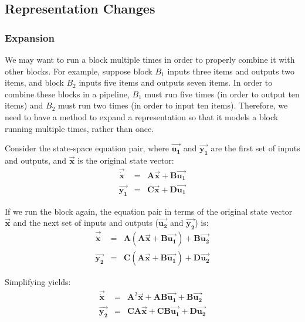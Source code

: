 \subsection{Representation Changes}

\subsubsection{Expansion}

    We may want to run a block multiple times in order to
properly combine it with other blocks. For example, suppose block
$B_1$ inputs three items and outputs two items, and block $B_2$
inputs five items and outputs seven items. In order to combine
these blocks in a pipeline, $B_1$ must run five times (in order to
output ten items) and $B_2$ must run two times (in order to input
ten items). Therefore, we need to have a method to expand a
representation so that it models a block running multiple times,
rather than once.

    Consider the state-space equation pair, where $\vec{\mathbf{u_1}}$ and
$\vec{\mathbf{y_1}}$ are the first set of inputs and outputs, and
$\vec{\mathbf{x}}$ is the original state vector:
\begin{eqnarray*}
\vec{\dot{\mathbf{x}}} & = & \mathbf{A}\vec{\mathbf{x}} + \mathbf{B}\vec{\mathbf{u_1}} \\
\vec{\mathbf{y_1}} & = & \mathbf{C}\vec{\mathbf{x}} +
\mathbf{D}\vec{\mathbf{u_1}}
\end{eqnarray*}

    If we run the block again, the equation pair in terms of the
original state vector $\vec{\mathbf{x}}$ and the next set of
inputs and outputs ($\vec{\mathbf{u_2}}$ and $\vec{\mathbf{y_2}}$)
is:
\begin{eqnarray*}
\vec{\dot{\mathbf{x}}} & = & \mathbf{A}(\mathbf{A}\vec{\mathbf{x}}
+
\mathbf{B}\vec{\mathbf{u_1}}) + \mathbf{B}\vec{\mathbf{u_2}} \\
\vec{\mathbf{y_2}} & = & \mathbf{C}(\mathbf{A}\vec{\mathbf{x}} +
\mathbf{B}\vec{\mathbf{u_1}}) + \mathbf{D}\vec{\mathbf{u_2}}
\end{eqnarray*}

Simplifying yields:
\begin{eqnarray*}
\vec{\dot{\mathbf{x}}} & = & \mathbf{A}^2\vec{\mathbf{x}} +
\mathbf{AB}\vec{\mathbf{u_1}} + \mathbf{B}\vec{\mathbf{u_2}} \\
\vec{\mathbf{y_2}} & = & \mathbf{CA}\vec{\mathbf{x}} +
\mathbf{CB}\vec{\mathbf{u_1}} + \mathbf{D}\vec{\mathbf{u_2}}
\end{eqnarray*}

